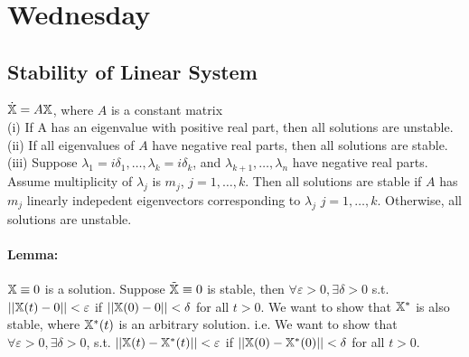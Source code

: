 \section{Wednesday}
\subsection{Stability of Linear System}
\begin{theorem}
$\dot{\mathbb{X}}=A\mathbb{X}$, where $A$ is a constant matrix\\
(i) If A has an eigenvalue with positive real part, then all solutions are unstable.\\
(ii) If all eigenvalues of $A$ have negative real parts, then all solutions are stable.\\
(iii) Suppose $\lambda_1=i\delta_1,\dots,\lambda_k=i\delta_k$, and $\lambda_{k+1},\dots, \lambda_n$ have negative real parts. Assume multiplicity of $\lambda_j$ is $m_j$, $j=1,\dots,k$. Then all solutions are stable if $A$ has $m_j$ linearly indepedent eigenvectors corresponding to $\lambda_j$ $j=1,\dots,k$. Otherwise, all solutions are unstable.


\end{theorem}
\paragraph{Lemma:} $\mathbb{X}\equiv0$ is a solution. Suppose $\tilde{\mathbb{X}}\equiv0$ is stable, then $\forall\varepsilon>0, \exists\delta>0$ s.t. $||\mathbb{X}(t)-0||<\varepsilon$ if $||\mathbb{X}(0)-0||<\delta$ for all $t>0$. We want to show that $\mathbb{X}^*$ is also stable, where $\mathbb{X}^*(t)$ is an arbitrary solution. i.e. We want to show that $\forall\varepsilon>0, \exists\delta>0$, s.t. $||\mathbb{X}(t)-\mathbb{X}^*(t)||<\varepsilon$ if $||\mathbb{X}(0)-\mathbb{X}^*(0)||<\delta$ for all $t>0$.




